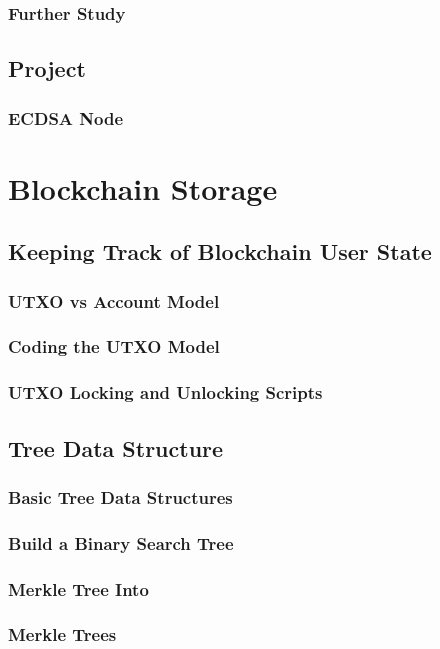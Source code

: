\documentclass[a4paper, oneside]{book}
\begin{document}
\subsection{Further Study}

\section{Project}
\subsection{ECDSA Node}


\chapter{Blockchain Storage}

\section{Keeping Track of Blockchain User State}
\subsection{UTXO vs Account Model}
\subsection{Coding the UTXO Model}
\subsection{UTXO Locking and Unlocking Scripts}

\section{Tree Data Structure}
\subsection{Basic Tree Data Structures}
\subsection{Build a Binary Search Tree}
\subsection{Merkle Tree Into}
\subsection{Merkle Trees}
\end{document}
